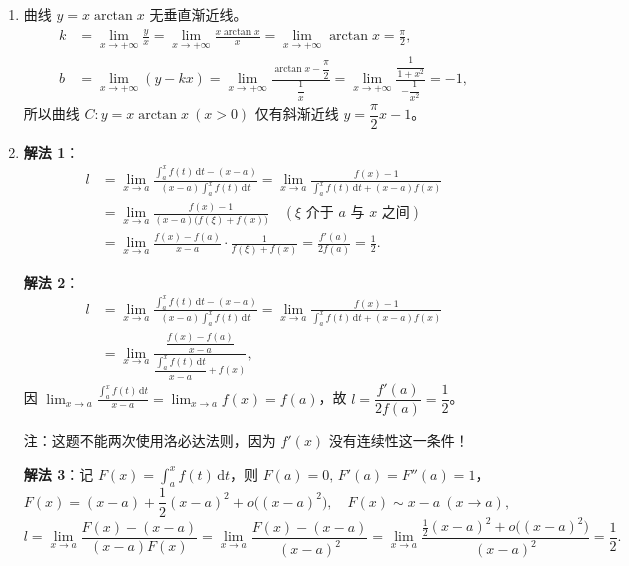 \documentclass[a4paper,11pt]{ctexart}
\newcommand{\dd}{\,\mathrm{d}}
\begin{document}
\begin{enumerate}[label=\arabic*., start=11, leftmargin=2em, itemsep=0.9em, topsep=0.5em]
  \item 曲线 $y=x\arctan x$ 无垂直渐近线。
  \begin{align*}
    k &= \lim_{x\to+\infty}\frac{y}{x} = \lim_{x\to+\infty}\frac{x\arctan x}{x} = \lim_{x\to+\infty}\arctan x = \frac{\pi}{2}, \\
    b &= \lim_{x\to+\infty}(y-kx) = \lim_{x\to+\infty}\frac{\arctan x-\dfrac{\pi}{2}}{\dfrac{1}{x}} = \lim_{x\to+\infty}\frac{\dfrac{1}{1+x^2}}{-\dfrac{1}{x^2}} = -1,
  \end{align*}
  所以曲线 $C:y=x\arctan x\ (x>0)$ 仅有斜渐近线 $y=\dfrac{\pi}{2}x-1$。

  \item \textbf{解法 1}：
  \begin{align*}
    l &= \lim_{x\to a}\frac{\displaystyle\int_a^x f(t)\dd t-(x-a)}{(x-a)\displaystyle\int_a^x f(t)\dd t}
       = \lim_{x\to a}\frac{f(x)-1}{\displaystyle\int_a^x f(t)\dd t+(x-a)f(x)} \\
      &= \lim_{x\to a}\frac{f(x)-1}{(x-a)\bigl(f(\xi)+f(x)\bigr)} \quad (\xi\text{ 介于 }a\text{ 与 }x\text{ 之间}) \\
      &= \lim_{x\to a}\frac{f(x)-f(a)}{x-a}\cdot\frac{1}{f(\xi)+f(x)} = \frac{f'(a)}{2f(a)} = \frac{1}{2}.
  \end{align*}

  \textbf{解法 2}：
  \begin{align*}
    l &= \lim_{x\to a}\frac{\displaystyle\int_a^x f(t)\dd t-(x-a)}{(x-a)\displaystyle\int_a^x f(t)\dd t}
       = \lim_{x\to a}\frac{f(x)-1}{\displaystyle\int_a^x f(t)\dd t+(x-a)f(x)} \\
      &= \lim_{x\to a}\frac{\dfrac{f(x)-f(a)}{x-a}}{\dfrac{\displaystyle\int_a^x f(t)\dd t}{x-a}+f(x)},
  \end{align*}
  因 $\displaystyle\lim_{x\to a}\frac{\displaystyle\int_a^x f(t)\dd t}{x-a}=\lim_{x\to a}f(x)=f(a)$，故 $l=\dfrac{f'(a)}{2f(a)}=\dfrac{1}{2}$。

  注：这题不能两次使用洛必达法则，因为 $f'(x)$ 没有连续性这一条件！

  \textbf{解法 3}：记 $F(x)=\displaystyle\int_a^x f(t)\dd t$，则 $F(a)=0,\,F'(a)=F''(a)=1$，
  \[
    F(x)=(x-a)+\frac{1}{2}(x-a)^2+o\bigl((x-a)^2\bigr),\quad F(x)\sim x-a\ (x\to a),
  \]
  \[
    l=\lim_{x\to a}\frac{F(x)-(x-a)}{(x-a)F(x)}
    =\lim_{x\to a}\frac{F(x)-(x-a)}{(x-a)^2}
    =\lim_{x\to a}\frac{\frac{1}{2}(x-a)^2+o\bigl((x-a)^2\bigr)}{(x-a)^2}=\frac{1}{2}.
  \]


\end{enumerate}
\end{document}
